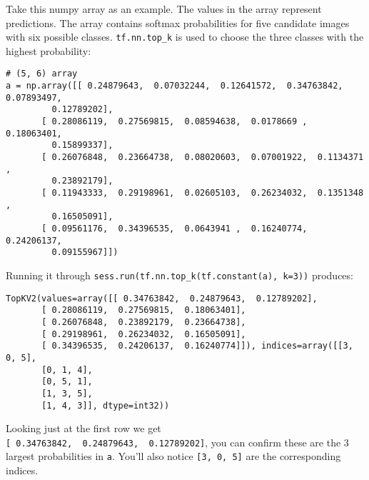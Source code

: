 \documentclass[11pt]{article}
\begin{document}
Take this numpy array as an example. The values in the array represent
predictions. The array contains softmax probabilities for five candidate
images with six possible classes. \texttt{tf.nn.top\_k} is used to
choose the three classes with the highest probability:

\begin{verbatim}
# (5, 6) array
a = np.array([[ 0.24879643,  0.07032244,  0.12641572,  0.34763842,  0.07893497,
         0.12789202],
       [ 0.28086119,  0.27569815,  0.08594638,  0.0178669 ,  0.18063401,
         0.15899337],
       [ 0.26076848,  0.23664738,  0.08020603,  0.07001922,  0.1134371 ,
         0.23892179],
       [ 0.11943333,  0.29198961,  0.02605103,  0.26234032,  0.1351348 ,
         0.16505091],
       [ 0.09561176,  0.34396535,  0.0643941 ,  0.16240774,  0.24206137,
         0.09155967]])
\end{verbatim}

Running it through \texttt{sess.run(tf.nn.top\_k(tf.constant(a),\ k=3))}
produces:

\begin{verbatim}
TopKV2(values=array([[ 0.34763842,  0.24879643,  0.12789202],
       [ 0.28086119,  0.27569815,  0.18063401],
       [ 0.26076848,  0.23892179,  0.23664738],
       [ 0.29198961,  0.26234032,  0.16505091],
       [ 0.34396535,  0.24206137,  0.16240774]]), indices=array([[3, 0, 5],
       [0, 1, 4],
       [0, 5, 1],
       [1, 3, 5],
       [1, 4, 3]], dtype=int32))
\end{verbatim}

Looking just at the first row we get
\texttt{{[}\ 0.34763842,\ \ 0.24879643,\ \ 0.12789202{]}}, you can
confirm these are the 3 largest probabilities in \texttt{a}. You'll also
notice \texttt{{[}3,\ 0,\ 5{]}} are the corresponding indices.
\end{document}
